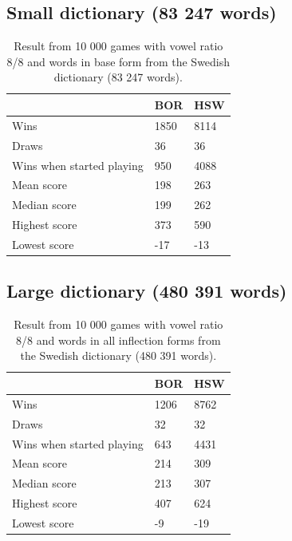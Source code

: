 \documentclass[a4paper, 12pt]{report}
\begin{document}
\subsection{Small dictionary (83 247 words)}
\begin{table}[h]
\centering
    \begin{tabular}{ l | l | l }
   	& BOR & HSW \\
   	\hline
   	Wins & 1850 & 8114 \\
	Draws & 36 & 36 \\
	Wins when started playing & 950 & 4088 \\   	
	Mean score & 198 & 263 \\
	Median score & 199 & 262\\	 	 
	Highest score & 373 & 590 \\
	Lowest score & -17 & -13 \\		
    \end{tabular}
\caption{Result from 10 000 games with vowel ratio 8/8 and words in base form from the Swedish dictionary (83 247 words).}
\label{tab:borhswstats8smallDict}
\end{table}

\subsection{Large dictionary (480 391 words)}
\begin{table}[h]
\centering
    \begin{tabular}{ l | l | l }
   	& BOR & HSW \\
   	\hline
   	Wins & 1206 & 8762 \\
	Draws & 32 & 32 \\
	Wins when started playing & 643 & 4431 \\   	
	Mean score & 214 & 309 \\
	Median score & 213 & 307 \\	 	 
	Highest score & 407 & 624 \\
	Lowest score & -9 & -19 \\		
    \end{tabular}
\caption{Result from 10 000 games with vowel ratio 8/8 and words in all inflection forms from the Swedish dictionary (480 391 words).}
\label{tab:borhswstats8}
\end{table}
\end{document}
